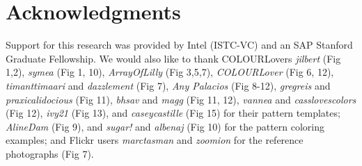 \section*{Acknowledgments}

Support for this research was provided by Intel (ISTC-VC) and an SAP Stanford Graduate Fellowship.
We would also like to thank COLOURLovers \textit{jilbert} (Fig 1,2), \textit{symea} (Fig 1, 10), \textit{ArrayOfLilly} (Fig 3,5,7), \textit{COLOURLover} (Fig 6, 12), \textit{timanttimaari} and \textit{dazzlement} (Fig 7), \textit{Any Palacios} (Fig 8-12), \textit{gregreis} and \textit{praxicalidocious} (Fig 11), \textit{bhsav} and \textit{magg} (Fig 11, 12), \textit{vannea} and \textit{casslovescolors} (Fig 12), \textit{ivy21} (Fig 13), and \textit{caseycastille} (Fig 15) for their pattern templates; \textit{AlineDam} (Fig 9), and \textit{sugar!} and \textit{albenaj} (Fig 10) for the pattern coloring examples; and Flickr users \textit{marctasman} and \textit{zoomion} for the reference photographs (Fig 7).   
